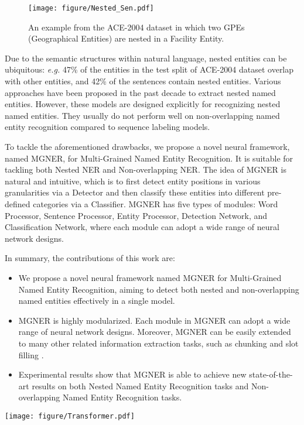 \documentclass[11pt,a4paper]{article}
\newcommand{\ModelName}{\textsc{MGNER}}
\newcommand{\multi}{Multi-Grained}
\begin{document}
\begin{figure}[bpth!]
    \centering
    \texttt{[image: figure/Nested\_Sen.pdf]}
    \caption{An example from the ACE-2004 dataset \cite{doddington2004automatic} in which two GPEs (Geographical Entities) are nested in a Facility Entity. } 
    \label{fig:multi}
\end{figure}

Due to the semantic structures within natural language, nested entities can be ubiquitous: {\it e.g.} 47\% of the entities in the test split of ACE-2004 \cite{doddington2004automatic} dataset overlap with other entities, and 42\% of the sentences contain nested entities.
Various approaches \cite{alex2007recognising, lu2015joint, katiyar2018nested, lu2017mention, wang2018neural} have been proposed in the past decade to extract nested named entities.
However, these models are designed explicitly for recognizing nested named entities. They usually do not perform well on non-overlapping named entity recognition compared to sequence labeling models.

To tackle the aforementioned drawbacks, we propose a novel neural framework, named {\ModelName}, for Multi-Grained Named Entity Recognition. It is suitable for tackling both Nested NER and Non-overlapping NER.
The idea of {\ModelName} is natural and intuitive, which is to first detect entity positions in various granularities via a Detector and then classify these entities into different pre-defined categories via a Classifier. {\ModelName} has five types of modules: Word Processor, Sentence Processor, Entity Processor, Detection Network, and Classification Network, where each module can adopt a wide range of neural network designs.

In summary, the contributions of this work are:
\begin{itemize}[leftmargin=*]
    \setlength\itemsep{0mm}
    \item We propose a novel neural framework named {\ModelName} for Multi-Grained Named Entity Recognition, aiming to detect both nested and non-overlapping named entities effectively in a single model.
    
    \item {\ModelName} is highly modularized. 
    Each module in {\ModelName} can adopt a wide range of neural network designs. Moreover, {\ModelName} can be easily extended to many other related information extraction tasks, such as chunking \cite{ramshaw1999text} and slot filling \cite{mesnil2015using}.
    
    \item Experimental results show that {\ModelName} is able to achieve new state-of-the-art results on both Nested Named Entity Recognition tasks and Non-overlapping Named Entity Recognition tasks.
    
\end{itemize} \begin{figure*}[!ht]
    \centering
    \texttt{[image: figure/Transformer.pdf]}
    \caption{The framework of {\ModelName} for {\multi} Named Entity Recognition. It consists of a Detector and a Classifier.
    }
    \label{fig:EPN}
\end{figure*}
\end{document}

